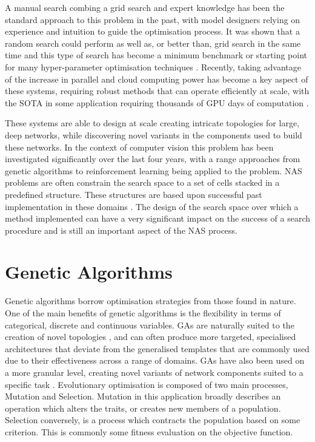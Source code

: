 A manual search combing a grid search and expert knowledge has been the standard approach to this problem in the past, with model designers relying on experience and intuition to guide the optimisation process.
It was shown that a random search could perform as well as, or better than, grid search in the same time \cite{50} and this type of search has become a minimum benchmark or starting point for many hyper-parameter optimisation techniques \cite{39}\cite{SH0}. Recently, taking advantage of the increase in parallel and cloud computing power has become a key aspect of these systems, requiring robust methods that can operate efficiently at scale, with the SOTA in some application requiring thousands of GPU days of computation \cite{51,41,NAS-RL,largescale}. 
		
 These systems are able to design at scale creating intricate topologies for large, deep networks, while discovering novel variants in the components used to build these networks. \cite{25} \cite{4} In the context of computer vision this problem has been investigated significantly over the last four years, with a range approaches from genetic algorithms to reinforcement learning being applied to the problem. NAS problems are often constrain the search space to a set of cells stacked in a predefined structure. These structures are based upon successful past implementation in these domains \cite{51,resnet,vgg,nasbench101}. The design of the search space over which a method implemented can have a very significant impact on the success of a search procedure and is still an important aspect of the NAS process.



		




\section {Genetic Algorithms}

	Genetic algorithms borrow optimisation strategies from those found in nature. One of the main benefits of genetic algorithms is the flexibility in terms of categorical, discrete and continuous variables. GAs are naturally suited to the creation of novel topologies\cite{24} \cite{25}, and can often produce more targeted, specialised architectures that deviate from the generalised templates that are commonly used due to their effectiveness across a range of domains. GAs have also been used on a more granular level, creating novel variants of network components suited to a specific task \cite{25}. Evolutionary optimisation is composed of two main processes, Mutation and Selection. Mutation in this application broadly describes an operation which alters the traits, or creates new members of a population. Selection conversely, is a process which contracts the population based on some criterion. This is commonly some fitness evaluation on the objective function.


